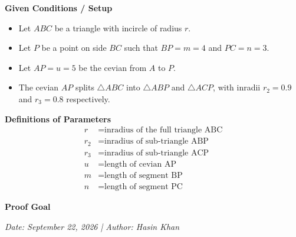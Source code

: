 \documentclass[11pt]{article}
\begin{document}
\thispagestyle{empty}

\begin{geomproblem}

\textbf{Given Conditions / Setup}
\begin{itemize}
    \item Let $ABC$ be a triangle with incircle of radius $r$.
    \item Let $P$ be a point on side $BC$ such that $BP = m = 4$ and $PC = n = 3$.
    \item Let $AP = u = 5$ be the cevian from $A$ to $P$.
    \item The cevian $AP$ splits $\triangle ABC$ into $\triangle ABP$ and $\triangle ACP$, with inradii $r_2 = 0.9$ and $r_3 = 0.8$ respectively.
\end{itemize}

\vspace{2mm}
\textbf{Definitions of Parameters}
\begin{align*}
    r &= \text{inradius of the full triangle ABC} \\
    r_2 &= \text{inradius of sub-triangle ABP} \\
    r_3 &= \text{inradius of sub-triangle ACP} \\
    u &= \text{length of cevian AP} \\
    m &= \text{length of segment BP} \\
    n &= \text{length of segment PC}
\end{align*}

\vspace{2mm}
\textbf{Proof Goal}
\begin{center}
\end{center}

\vspace{3mm}
\hfill\textit{\small Date: September 22, 2026 \quad | \quad Author: Hasin Khan}

\end{geomproblem}
\end{document}
